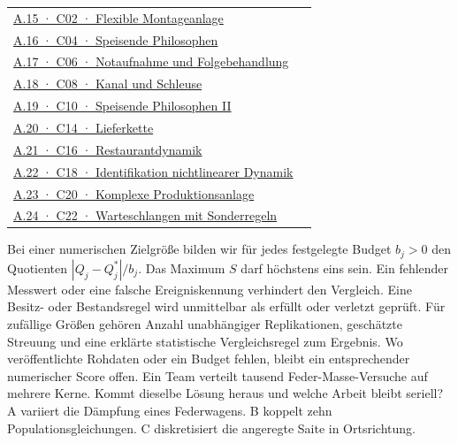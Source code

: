 {\tblstart\begin{tabularx}{\linewidth}{@{}Yr@{}}\toprule
\hyperlink{refC02}{A.15 · C02 · Flexible Montageanlage} & \\[2pt]
\hyperlink{refC04}{A.16 · C04 · Speisende Philosophen} & \\[2pt]
\hyperlink{refC06}{A.17 · C06 · Notaufnahme und Folgebehandlung} & \\[2pt]
\hyperlink{refC08}{A.18 · C08 · Kanal und Schleuse} & \\[2pt]
\hyperlink{refC10}{A.19 · C10 · Speisende Philosophen II} & \\[2pt]
\hyperlink{refC14}{A.20 · C14 · Lieferkette} & \\[2pt]
\hyperlink{refC16}{A.21 · C16 · Restaurantdynamik} & \\[2pt]
\hyperlink{refC18}{A.22 · C18 · Identifikation nichtlinearer Dynamik} & \\[2pt]
\hyperlink{refC20}{A.23 · C20 · Komplexe Produktionsanlage} & \\[2pt]
\hyperlink{refC22}{A.24 · C22 · Warteschlangen mit Sonderregeln} & \\[2pt]
\bottomrule\end{tabularx}\par}
Bei einer numerischen Zielgröße bilden wir für jedes festgelegte Budget \(b_j>0\) den Quotienten \(|Q_j-Q_j^*|/b_j\). Das Maximum \(S\) darf höchstens eins sein. Ein fehlender Messwert oder eine falsche Ereigniskennung verhindert den Vergleich. Eine Besitz- oder Bestandsregel wird unmittelbar als erfüllt oder verletzt geprüft. Für zufällige Größen gehören Anzahl unabhängiger Replikationen, geschätzte Streuung und eine erklärte statistische Vergleichsregel zum Ergebnis. Wo veröffentlichte Rohdaten oder ein Budget fehlen, bleibt ein entsprechender numerischer Score offen.
Ein Team verteilt tausend Feder-Masse-Versuche auf mehrere Kerne. Kommt dieselbe Lösung heraus und welche Arbeit bleibt seriell?
A variiert die Dämpfung eines Federwagens. B koppelt zehn Populationsgleichungen. C diskretisiert die angeregte Saite in Ortsrichtung.
